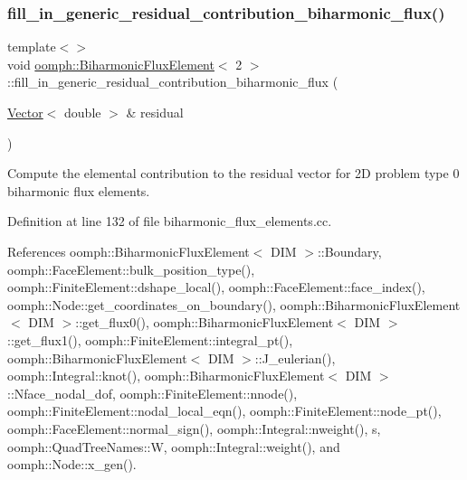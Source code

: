 \subsubsection{\texorpdfstring{fill\+\_\+in\+\_\+generic\+\_\+residual\+\_\+contribution\+\_\+biharmonic\+\_\+flux()}{fill\_in\_generic\_residual\_contribution\_biharmonic\_flux()}\hspace{0.1cm}{\footnotesize\ttfamily [1/2]}}
{\footnotesize\ttfamily template$<$$>$ \\
void \hyperlink{classoomph_1_1BiharmonicFluxElement}{oomph\+::\+Biharmonic\+Flux\+Element}$<$ 2 $>$\+::fill\+\_\+in\+\_\+generic\+\_\+residual\+\_\+contribution\+\_\+biharmonic\+\_\+flux (\begin{DoxyParamCaption}\item[{\hyperlink{classoomph_1_1Vector}{Vector}$<$ double $>$ \&}]{residual }\end{DoxyParamCaption})\hspace{0.3cm}{\ttfamily [private]}}



Compute the elemental contribution to the residual vector for 2D problem type 0 biharmonic flux elements. 



Definition at line 132 of file biharmonic\+\_\+flux\+\_\+elements.\+cc.



References oomph\+::\+Biharmonic\+Flux\+Element$<$ D\+I\+M $>$\+::\+Boundary, oomph\+::\+Face\+Element\+::bulk\+\_\+position\+\_\+type(), oomph\+::\+Finite\+Element\+::dshape\+\_\+local(), oomph\+::\+Face\+Element\+::face\+\_\+index(), oomph\+::\+Node\+::get\+\_\+coordinates\+\_\+on\+\_\+boundary(), oomph\+::\+Biharmonic\+Flux\+Element$<$ D\+I\+M $>$\+::get\+\_\+flux0(), oomph\+::\+Biharmonic\+Flux\+Element$<$ D\+I\+M $>$\+::get\+\_\+flux1(), oomph\+::\+Finite\+Element\+::integral\+\_\+pt(), oomph\+::\+Biharmonic\+Flux\+Element$<$ D\+I\+M $>$\+::\+J\+\_\+eulerian(), oomph\+::\+Integral\+::knot(), oomph\+::\+Biharmonic\+Flux\+Element$<$ D\+I\+M $>$\+::\+Nface\+\_\+nodal\+\_\+dof, oomph\+::\+Finite\+Element\+::nnode(), oomph\+::\+Finite\+Element\+::nodal\+\_\+local\+\_\+eqn(), oomph\+::\+Finite\+Element\+::node\+\_\+pt(), oomph\+::\+Face\+Element\+::normal\+\_\+sign(), oomph\+::\+Integral\+::nweight(), s, oomph\+::\+Quad\+Tree\+Names\+::W, oomph\+::\+Integral\+::weight(), and oomph\+::\+Node\+::x\+\_\+gen().

\mbox{\label{classoomph_1_1BiharmonicFluxElement_aa2de83c41435886f3bd1eb8f5bd3d9f6}} 
